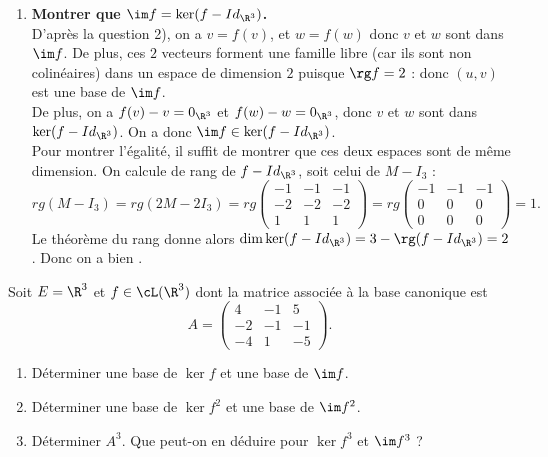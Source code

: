 \documentclass[a4paper, 11pt,reqno]{article}
\begin{document}
\begin{correction}
\begin{enumerate}
		      On a une famille de $3$ \'el\'ements dans un espace de dimension $3$ : il suffit de montrer qu'elle est libre (\`a faire). On a donc .
		\item \textbf{Montrer que $\im f=\ker (f-Id_{\R^3})$.}\\
		      D'apr\`es la question 2), on a $v=f(v)$, et $w=f(w)$ donc $v$ et $w$ sont dans $\im f$. De plus, ces $2$ vecteurs forment une famille libre  (car ils sont non colin\'eaires) dans un espace de dimension $2$ puisque $\rg f =2$ : donc $(u,v)$ est une base de $\im f$.\\
		      De plus, on a $f(v)-v=0_{\R^3}$ et $f(w)-w=0_{\R^3}$, donc $v$ et $w$ sont dans $\ker (f-Id_{\R^3})$. On a donc $\im f \in \ker(f-Id_{\R^3})$.\\
		      Pour montrer l'\'egalit\'e, il suffit de montrer que ces deux espaces sont de m\^eme dimension. On calcule de rang de $f-Id_{\R^3}$, soit celui de $M-I_3$ :
		      $$ rg(M-I_3) = rg(2M-2I_3) = rg \left(\begin{array}{rrr}
					      -1 & -1 & -1 \\
					      -2 & -2 & -2 \\
					      1  & 1  & 1
				      \end{array}\right)
			      =
			      rg \left(\begin{array}{rrr}
					      -1 & -1 & -1 \\
					      0  & 0  & 0  \\
					      0  & 0  & 0
				      \end{array}\right) = 1.$$
		      Le th\'eor\`eme du rang donne alors $\dim \ker(f-Id_{\R^3}) = 3 - \rg(f-Id_{\R^3}) = 2$. Donc on a bien .
	\end{enumerate}
\end{correction}
\begin{exercice}  \;
	Soit $E=\R^3$ et $f\in\cL(\R^3)$ dont la matrice associ\'ee \`a la base canonique est
	$$A=\left(\begin{array}{rrr} 4&-1&5\\ -2&-1&-1\\ -4&1&-5 \end{array}\right).$$
	\begin{enumerate}
		\item D\'eterminer une base de $\ker f$ et une base de $\im f$.
		\item D\'eterminer une base de $\ker f^2$ et une base de $\im f^2$.
		\item D\'eterminer $A^3$. Que peut-on en d\'eduire pour $\ker f^3$ et $\im f^3$ ?
	\end{enumerate}
\end{exercice}
\end{document}
